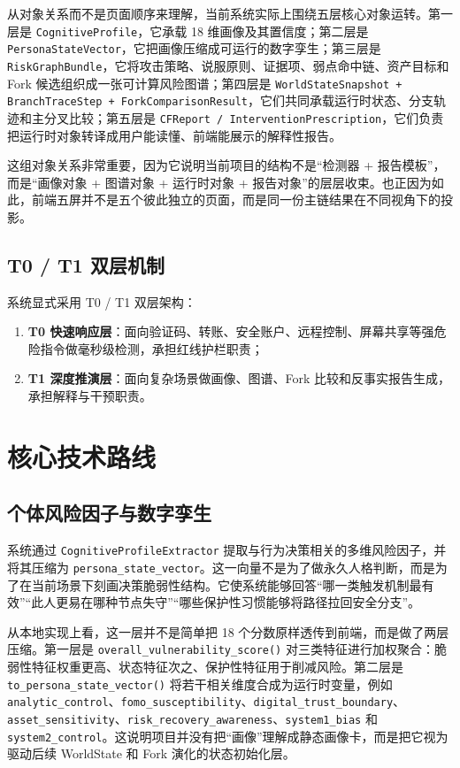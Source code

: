 \documentclass[12pt,a4paper]{ctexart}
\begin{document}
从对象关系而不是页面顺序来理解，当前系统实际上围绕五层核心对象运转。第一层是 \texttt{CognitiveProfile}，它承载 18 维画像及其置信度；第二层是 \texttt{PersonaStateVector}，它把画像压缩成可运行的数字孪生；第三层是 \texttt{RiskGraphBundle}，它将攻击策略、说服原则、证据项、弱点命中链、资产目标和 Fork 候选组织成一张可计算风险图谱；第四层是 \texttt{WorldStateSnapshot + BranchTraceStep + ForkComparisonResult}，它们共同承载运行时状态、分支轨迹和主分叉比较；第五层是 \texttt{CFReport / InterventionPrescription}，它们负责把运行时对象转译成用户能读懂、前端能展示的解释性报告。

这组对象关系非常重要，因为它说明当前项目的结构不是“检测器 + 报告模板”，而是“画像对象 + 图谱对象 + 运行时对象 + 报告对象”的层层收束。也正因为如此，前端五屏并不是五个彼此独立的页面，而是同一份主链结果在不同视角下的投影。

\subsection{T0 / T1 双层机制}

系统显式采用 T0 / T1 双层架构：
\begin{enumerate}[leftmargin=2em]
  \item \textbf{T0 快速响应层}：面向验证码、转账、安全账户、远程控制、屏幕共享等强危险指令做毫秒级检测，承担红线护栏职责；
  \item \textbf{T1 深度推演层}：面向复杂场景做画像、图谱、Fork 比较和反事实报告生成，承担解释与干预职责。
\end{enumerate}

\section{核心技术路线}

\subsection{个体风险因子与数字孪生}

系统通过 \texttt{CognitiveProfileExtractor} 提取与行为决策相关的多维风险因子，并将其压缩为 \texttt{persona\_state\_vector}。这一向量不是为了做永久人格判断，而是为了在当前场景下刻画决策脆弱性结构。它使系统能够回答“哪一类触发机制最有效”“此人更易在哪种节点失守”“哪些保护性习惯能够将路径拉回安全分支”。

从本地实现上看，这一层并不是简单把 18 个分数原样透传到前端，而是做了两层压缩。第一层是 \texttt{overall\_vulnerability\_score()} 对三类特征进行加权聚合：脆弱性特征权重更高、状态特征次之、保护性特征用于削减风险。第二层是 \texttt{to\_persona\_state\_vector()} 将若干相关维度合成为运行时变量，例如 \texttt{analytic\_control}、\texttt{fomo\_susceptibility}、\texttt{digital\_trust\_boundary}、\texttt{asset\_sensitivity}、\texttt{risk\_recovery\_awareness}、\texttt{system1\_bias} 和 \texttt{system2\_control}。这说明项目并没有把“画像”理解成静态画像卡，而是把它视为驱动后续 WorldState 和 Fork 演化的状态初始化层。
\end{document}

